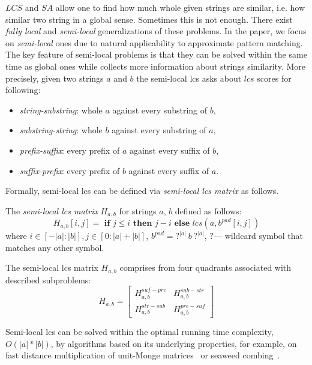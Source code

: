 $LCS$ and $SA$ allow one to find how much whole given strings are similar, i.e. how similar two string in a global sense.
Sometimes this is not enough.
There exist \emph{fully local} and \emph{semi-local} generalizations of these problems.
In the paper, we focus on \emph{semi-local} ones due to natural applicability to approximate pattern matching.
The key feature of semi-local problems is that they can be solved within the same time as global ones while collects more information about strings similarity.
More precisely, given two strings $a$ and $b$ the semi-local lcs asks about $lcs$ scores for following:
\begin{itemize}
\item \emph{string-substring}: whole $a$ against every substring of $b$,
\item \emph{substring-string}: whole $b$ against every substring of $a$,
\item \emph{prefix-suffix}: every prefix of $a$ against every suffix of $b$,
\item \emph{suffix-prefix}: every prefix of $b$ against every suffix of $a$.
\end{itemize} 
Formally, semi-local lcs can be defined via \emph{semi-local lcs matrix} as follows.
\begin{definition}
The \emph{semi-local lcs matrix}  $H_{a,b}$ for strings $a$, $b$ defined as follows:
\begin{equation}
  H_{a,b}[i,j] = \textbf{ if } j\leq i \textbf{ then } j-i \textbf{ else } lcs(a,b^{pad}[i,j]) 
\end{equation} 
where $i \in [-|a|:|b|], j \in [0:|a|+|b|] $, $b^{pad}= ?^{|a|}\ b\ ?^{|a|}$, $?$--- wildcard symbol that matches any other symbol.
\end{definition}
The semi-local lcs matrix $H_{a,b}$ comprises from four quadrants associated with described subproblems:
\begin{equation}
  H_{a,b} = \begin{bmatrix}
    H_{a,b}^{suf-pre} & H_{a,b}^{sub-str} \\
    H_{a,b}^{str-sub} & H_{a,b}^{pre-suf} 
  \end{bmatrix}    
\end{equation}

Semi-local lcs can be solved within the optimal running time complexity, $O(|a| * |b|)$, by algorithms based on its underlying properties, for example, on fast distance multiplication of unit-Monge matrices~\cite{tiskin2008semi} or seaweed combing~\cite{tiskin2015fast}.

